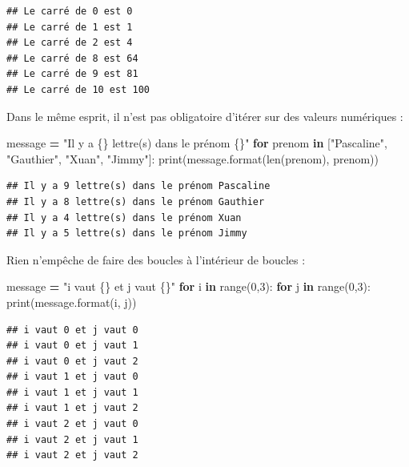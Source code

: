 \documentclass[12pt,]{book}
\newenvironment{Shaded}{\begin{snugshade}}{\end{snugshade}}
\newcommand{\KeywordTok}[1]{\textcolor[rgb]{0.13,0.29,0.53}{\textbf{#1}}}
\newcommand{\DecValTok}[1]{\textcolor[rgb]{0.00,0.00,0.81}{#1}}
\newcommand{\SpecialCharTok}[1]{\textcolor[rgb]{0.00,0.00,0.00}{#1}}
\newcommand{\StringTok}[1]{\textcolor[rgb]{0.31,0.60,0.02}{#1}}
\newcommand{\ControlFlowTok}[1]{\textcolor[rgb]{0.13,0.29,0.53}{\textbf{#1}}}
\newcommand{\OperatorTok}[1]{\textcolor[rgb]{0.81,0.36,0.00}{\textbf{#1}}}
\newcommand{\BuiltInTok}[1]{#1}
\newcommand{\NormalTok}[1]{#1}
\numberwithin{equation}{section}
\numberwithin{countremarque}{section}
\begin{document}
\begin{lstlisting}
## Le carré de 0 est 0
## Le carré de 1 est 1
## Le carré de 2 est 4
## Le carré de 8 est 64
## Le carré de 9 est 81
## Le carré de 10 est 100
\end{lstlisting}

Dans le même esprit, il n'est pas obligatoire d'itérer sur des valeurs
numériques :

\begin{Shaded}
\begin{Highlighting}[]
\NormalTok{message }\OperatorTok{=} \StringTok{"Il y a }\SpecialCharTok{\{\}}\StringTok{ lettre(s) dans le prénom }\SpecialCharTok{\{\}}\StringTok{"}
\ControlFlowTok{for}\NormalTok{ prenom }\KeywordTok{in}\NormalTok{ [}\StringTok{"Pascaline"}\NormalTok{, }\StringTok{"Gauthier"}\NormalTok{, }\StringTok{"Xuan"}\NormalTok{, }\StringTok{"Jimmy"}\NormalTok{]:}
  \BuiltInTok{print}\NormalTok{(message.}\BuiltInTok{format}\NormalTok{(}\BuiltInTok{len}\NormalTok{(prenom), prenom))}
\end{Highlighting}
\end{Shaded}

\begin{lstlisting}
## Il y a 9 lettre(s) dans le prénom Pascaline
## Il y a 8 lettre(s) dans le prénom Gauthier
## Il y a 4 lettre(s) dans le prénom Xuan
## Il y a 5 lettre(s) dans le prénom Jimmy
\end{lstlisting}

Rien n'empêche de faire des boucles à l'intérieur de boucles :

\begin{Shaded}
\begin{Highlighting}[]
\NormalTok{message }\OperatorTok{=} \StringTok{"i vaut }\SpecialCharTok{\{\}}\StringTok{ et j vaut }\SpecialCharTok{\{\}}\StringTok{"}
\ControlFlowTok{for}\NormalTok{ i }\KeywordTok{in} \BuiltInTok{range}\NormalTok{(}\DecValTok{0}\NormalTok{,}\DecValTok{3}\NormalTok{):}
    \ControlFlowTok{for}\NormalTok{ j }\KeywordTok{in} \BuiltInTok{range}\NormalTok{(}\DecValTok{0}\NormalTok{,}\DecValTok{3}\NormalTok{):}
        \BuiltInTok{print}\NormalTok{(message.}\BuiltInTok{format}\NormalTok{(i, j))}
\end{Highlighting}
\end{Shaded}

\begin{lstlisting}
## i vaut 0 et j vaut 0
## i vaut 0 et j vaut 1
## i vaut 0 et j vaut 2
## i vaut 1 et j vaut 0
## i vaut 1 et j vaut 1
## i vaut 1 et j vaut 2
## i vaut 2 et j vaut 0
## i vaut 2 et j vaut 1
## i vaut 2 et j vaut 2
\end{lstlisting}
\end{document}
